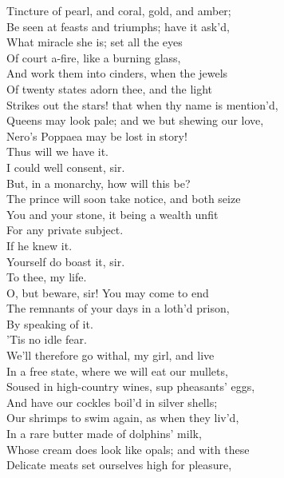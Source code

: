 \documentclass[a4paper,oneside]{memoir}
\begin{document}
\begin{drama*}
Tincture of pearl, and coral, gold, and amber;\\
Be seen at feasts and triumphs; have it ask'd,\\
What miracle she is; set all the eyes\\
Of court a-fire, like a burning glass,\\
And work them into cinders, when the jewels\\
Of twenty states adorn thee, and the light\\
Strikes out the stars! that when thy name is mention'd,\\
Queens may look pale; and we but shewing our love,\\
Nero's Poppaea may be lost in story!\\
Thus will we have it.\\
\dolspeaks {} I could well consent, sir.\\
But, in a monarchy, how will this be?\\
The prince will soon take notice, and both seize\\
You and your stone, it being a wealth unfit\\
For any private subject.\\
\mammonspeaks {} If he knew it.\\
\dolspeaks Yourself do boast it, sir.\\
\mammonspeaks {} To thee, my life.\\
\dolspeaks O, but beware, sir! You may come to end\\
The remnants of your days in a loth'd prison,\\
By speaking of it.\\
\mammonspeaks {} 'Tis no idle fear.\\
We'll therefore go withal, my girl, and live\\
In a free state, where we will eat our mullets,\\
Soused in high-country wines, sup pheasants' eggs,\\
And have our cockles boil'd in silver shells;\\
Our shrimps to swim again, as when they liv'd,\\
In a rare butter made of dolphins' milk,\\
Whose cream does look like opals; and with these\\
Delicate meats set ourselves high for pleasure,\\

\end{drama*}
\end{document}
